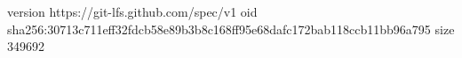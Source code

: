 version https://git-lfs.github.com/spec/v1
oid sha256:30713c711eff32fdcb58e89b3b8c168ff95e68dafc172bab118ccb11bb96a795
size 349692
